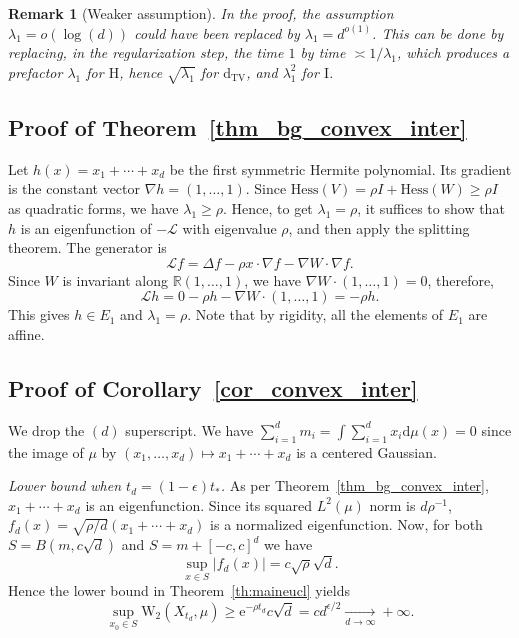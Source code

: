 \documentclass[10pt,reqno]{amsart}
\newtheorem{remark}[theorem]{Remark}
\numberwithin{equation}{section}
\newcommand{\DTV}{\mathrm{d}_{\mathrm{TV}}}
\begin{document}
\begin{remark}[Weaker assumption]
  In the proof, the assumption $\lambda_1=o(\log(d))$ could have been replaced
  by $\lambda_1=d^{o(1)}$. This can be done by replacing, in the
  regularization step, the time $1$ by time $\asymp 1/\lambda_1$, which
  produces a prefactor $\lambda_1$ for $\mathrm{H}$, hence $\sqrt{\lambda_1}$
  for $\DTV$, and $\lambda_1^2$ for $\mathrm{I}$.
\end{remark}

\subsection{Proof of Theorem~\ref{thm_bg_convex_inter}}

Let $h(x)=x_1+\cdots+x_d$ be the first symmetric Hermite polynomial. Its
gradient is the constant vector $\nabla h=(1,\ldots,1)$. Since
$\mathrm{Hess}(V)=\rho I+\mathrm{Hess}(W)\geq\rho I$ as quadratic forms, we have
$\lambda_1 \geq \rho$. Hence, to get $\lambda_1 = \rho$, it suffices to show
that $h$ is an eigenfunction of $-\mathcal{L}$ with eigenvalue $\rho$, and
then apply the splitting theorem. The generator is
\begin{equation}
  \mathcal{L} f = \Delta f - \rho x \cdot \nabla f - \nabla W \cdot \nabla f.
\end{equation}
Since $W$ is invariant along $\mathbb{R}(1,\ldots,1)$, we have $\nabla W \cdot (1,\ldots,1) = 0$, therefore,
\begin{equation}
  \mathcal{L} h=0-\rho h-\nabla W\cdot(1,\ldots,1)=-\rho h.
\end{equation}
This gives $h\in E_1$ and $\lambda_1=\rho$. Note that by rigidity, all the elements of $E_1$ are affine.

\subsection{Proof of Corollary~\ref{cor_convex_inter}}

We drop the $(d)$ superscript. We have
$\sum_{i=1}^d m_i=\int\sum_{i=1}^d x_i\mathrm{d}\mu(x)=0$ since the image of
$\mu$ by $(x_1,\ldots,x_d)\mapsto x_1+\cdots+x_d$ is a centered Gaussian.

\emph{Lower bound when $t_d = (1-\epsilon)t_*$.} As per
Theorem~\ref{thm_bg_convex_inter}, $x_1 + \cdots + x_d$ is an eigenfunction.
Since its squared $L^2(\mu)$ norm is $d\rho^{-1}$,
$f_d(x) = \sqrt{\rho/d}(x_1 + \cdots + x_d)$ is a normalized eigenfunction.
Now, for both $S = B(m, c\sqrt{d})$ and $S = m + [-c,c]^d$ we have
\begin{equation}
\sup_{x \in S }|f_d(x)| = c\sqrt{\rho}\sqrt{d}.
\end{equation}
Hence the lower bound in Theorem~\ref{th:maineucl} yields 
\begin{equation}
  \sup_{x_0\in S}\mathrm{W}_2(X_{t_d}, \mu) \geq \mathrm{e}^{-\rho t_d}c\sqrt{d} = cd^{\epsilon/2} \xrightarrow[d\to\infty]{}+\infty.
\end{equation}
\end{document}
